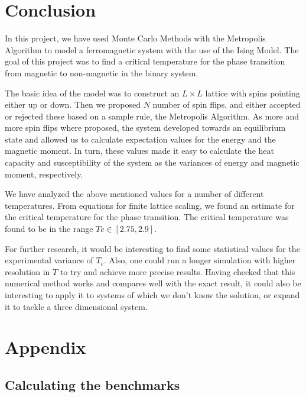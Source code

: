 \documentclass[12pt,english,a4paper]{article}
\begin{document}
\section{Conclusion} \label{conclusion}

In this project, we have used Monte Carlo Methods with the Metropolis Algorithm to model a ferromagnetic system with the use of the Ising Model. The goal of this project was to find a critical temperature for the phase transition from magnetic to non-magnetic in the binary system.

The basic idea of the model was to construct an $L \times L$ lattice with spins pointing either up or down. Then we proposed $N$ number of spin flips, and either accepted or rejected these based on a sample rule, the Metropolis Algorithm. As more and more spin flips where proposed, the system developed towards an equilibrium state and allowed us to calculate expectation values for the energy and the magnetic moment. In turn, these values made it easy to calculate the heat capacity and susceptibility of the system as the variances of energy and magnetic moment, respectively. 

We have analyzed the above mentioned values for a number of different temperatures. From equations for finite lattice scaling, we found an estimate for the critical temperature for the phase transition. The critical temperature was found to be in the range $Tc \in [2.75,2.9]$.

For further research, it would be interesting to find some statistical values for the experimental variance of $T_c$. Also, one could run a longer simulation with higher resolution in $T$ to try and achieve more precise results. Having checked that this numerical method works and compares well with the exact result, it could also be interesting to apply it to systems of which we don't know the solution, or expand it to tackle a three dimensional system. 

\section{Appendix} \label{appendix}

\subsection{Calculating the benchmarks}
\end{document}
